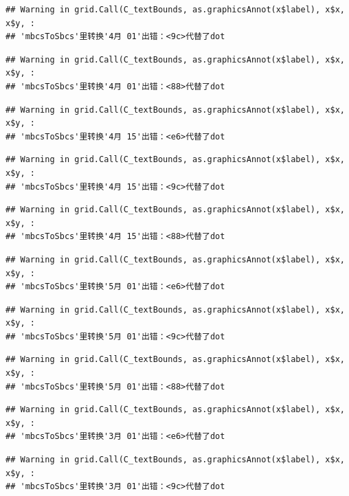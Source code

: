\documentclass[
]{article}
\begin{document}
\begin{verbatim}
## Warning in grid.Call(C_textBounds, as.graphicsAnnot(x$label), x$x, x$y, :
## 'mbcsToSbcs'里转换'4月 01'出错：<9c>代替了dot
\end{verbatim}

\begin{verbatim}
## Warning in grid.Call(C_textBounds, as.graphicsAnnot(x$label), x$x, x$y, :
## 'mbcsToSbcs'里转换'4月 01'出错：<88>代替了dot
\end{verbatim}

\begin{verbatim}
## Warning in grid.Call(C_textBounds, as.graphicsAnnot(x$label), x$x, x$y, :
## 'mbcsToSbcs'里转换'4月 15'出错：<e6>代替了dot
\end{verbatim}

\begin{verbatim}
## Warning in grid.Call(C_textBounds, as.graphicsAnnot(x$label), x$x, x$y, :
## 'mbcsToSbcs'里转换'4月 15'出错：<9c>代替了dot
\end{verbatim}

\begin{verbatim}
## Warning in grid.Call(C_textBounds, as.graphicsAnnot(x$label), x$x, x$y, :
## 'mbcsToSbcs'里转换'4月 15'出错：<88>代替了dot
\end{verbatim}

\begin{verbatim}
## Warning in grid.Call(C_textBounds, as.graphicsAnnot(x$label), x$x, x$y, :
## 'mbcsToSbcs'里转换'5月 01'出错：<e6>代替了dot
\end{verbatim}

\begin{verbatim}
## Warning in grid.Call(C_textBounds, as.graphicsAnnot(x$label), x$x, x$y, :
## 'mbcsToSbcs'里转换'5月 01'出错：<9c>代替了dot
\end{verbatim}

\begin{verbatim}
## Warning in grid.Call(C_textBounds, as.graphicsAnnot(x$label), x$x, x$y, :
## 'mbcsToSbcs'里转换'5月 01'出错：<88>代替了dot
\end{verbatim}

\begin{verbatim}
## Warning in grid.Call(C_textBounds, as.graphicsAnnot(x$label), x$x, x$y, :
## 'mbcsToSbcs'里转换'3月 01'出错：<e6>代替了dot
\end{verbatim}

\begin{verbatim}
## Warning in grid.Call(C_textBounds, as.graphicsAnnot(x$label), x$x, x$y, :
## 'mbcsToSbcs'里转换'3月 01'出错：<9c>代替了dot
\end{verbatim}
\end{document}
